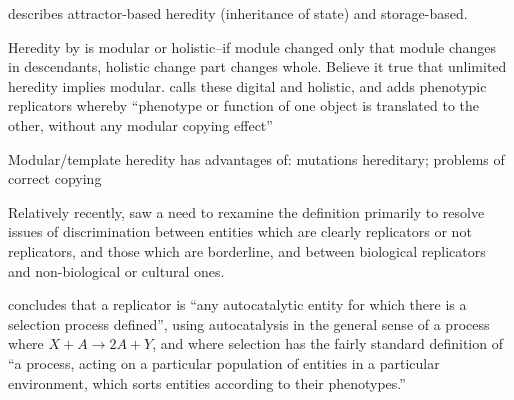 \cite{Hogeweg1998} describes attractor-based heredity (inheritance of state) and storage-based. 

Heredity by \cite{MaynardSmith1999} is modular or holistic--if module changed only that module changes in descendants, holistic change part changes whole. Believe it true that unlimited heredity implies modular. \cite{Szathmary1999} calls these digital and holistic, and adds phenotypic replicators whereby ``phenotype or function of one object is translated to the other, without any modular copying effect” 

Modular/template heredity has advantages of: mutations hereditary; problems of correct copying \parencite{Eigen1977}

Relatively recently, \cite{Zachar2010} saw a need to rexamine the definition primarily to resolve issues of discrimination between entities which are clearly replicators or not replicators, and those which are borderline, and between biological replicators and non-biological or cultural ones. 


\Cite{Zachar2010} concludes that a replicator is ``any autocatalytic entity for which there is a selection process defined'', using autocatalysis in the general sense of a process where $X + A\rightarrow 2A + Y$, and where selection has the fairly standard definition of ``a process, acting on a particular population of entities in a particular environment, which sorts entities according to their phenotypes.'' \parencite[p.21]{Zachar2010}

